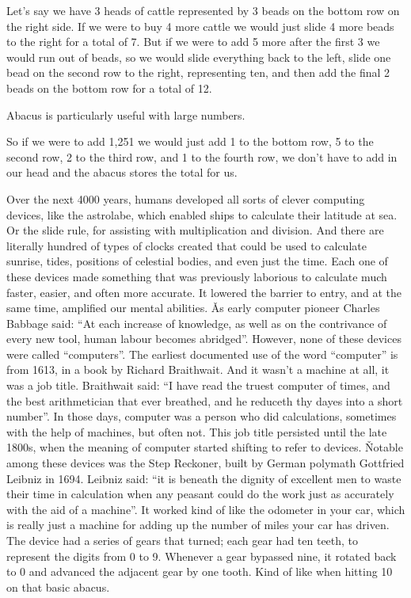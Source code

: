 \be
Let's say we have 3 heads of cattle represented by 3 beads on the bottom row on the right side. If we were to buy 4
more cattle we would just slide 4 more beads to the right for a total of 7. But if we were to add 5 more after the
first 3 we would run out of beads, so we would slide everything back to the left, slide one bead on the second row to
the right, representing ten, and then add the final 2 beads on the bottom row for a total of 12.
\ee

Abacus is particularly useful with large numbers.

\be
So if we were to add 1,251 we would just add 1 to the bottom row, 5 to the second row, 2 to the third row, and 1 to
the fourth row, we don't have to add in our head and the abacus stores the total for us.
\ee

Over the next 4000 years, humans developed all sorts of clever computing devices, like the astrolabe, which enabled
ships to calculate their latitude at sea. Or the slide rule, for assisting with multiplication and division. And
there are literally hundred of types of clocks created that could be used to calculate sunrise, tides, positions of
celestial bodies, and even just the time. Each one of these devices made something that was previously laborious to
calculate much faster, easier, and often more accurate. It lowered the barrier to entry, and at the same time,
amplified our mental abilities. \v

As early computer pioneer Charles Babbage said: ``At each increase of knowledge, as well as on the contrivance of
every new tool, human labour becomes abridged''. However, none of these devices were called ``computers''. The
earliest documented use of the word ``computer'' is from 1613, in a book by Richard Braithwait. And it wasn't a
machine at all, it was a job title. Braithwait said: ``I have read the truest computer of times, and the best
arithmetician that ever breathed, and he reduceth thy dayes into a short number''. In those days, computer was a
person who did calculations, sometimes with the help of machines, but often not. This job title persisted until the
late 1800s, when the meaning of computer started shifting to refer to devices. \v

Notable among these devices was the Step Reckoner, built by German polymath Gottfried Leibniz in 1694. Leibniz said:
``it is beneath the dignity of excellent men to waste their time in calculation when any peasant could do the work
just as accurately with the aid of a machine''. It worked kind of like the odometer in your car, which is really just
a machine for adding up the number of miles your car has driven. The device had a series of gears that turned; each
gear had ten teeth, to represent the digits from 0 to 9. Whenever a gear bypassed nine, it rotated back to 0 and
advanced the adjacent gear by one tooth. Kind of like when hitting 10 on that basic abacus.

